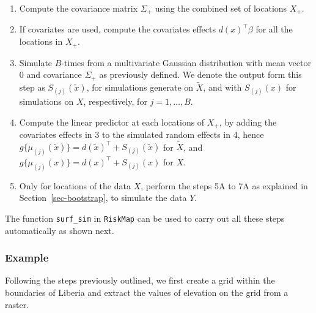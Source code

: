 \documentclass[
  letterpaper,
]{krantz}
\begin{document}
\begin{enumerate}
\def\labelenumi{\arabic{enumi}.}
\item
  Compute the covariance matrix \(\Sigma_{+}\) using the combined set of
  locations \(X_{+}\).
\item
  If covariates are used, compute the covariates effects
  \(d(x)^\top \beta\) for all the locations in \(X_{+}\).
\item
  Simulate \(B\)-times from a multivariate Gaussian distribution with
  mean vector 0 and covariance \(\Sigma_{+}\) as previously defined. We
  denote the output form this step as \(S_{(j)}(\tilde{x})\), for
  simulations generate on \(\tilde{X}\), and with \(S_{(j)}(x)\) for
  simulations on \(X\), respectively, for \(j=1,\ldots,B\).
\item
  Compute the linear predictor at each locations of \(X_{+}\), by adding
  the covariates effects in 3 to the simulated random effects in 4,
  hence
  \(g\{\mu_{(j)}(\tilde{x})\} = d(\tilde{x})^\top + S_{(j)}(\tilde{x})\)
  for \(\tilde{X}\), and \(g\{\mu_{(j)}(x)\} = d(x)^\top + S_{(j)}(x)\)
  for \(X\).
\item
  Only for locations of the data \(X\), perform the steps 5A to 7A as
  explained in Section~\ref{sec-bootstrap}, to simulate the data \(Y\).
\end{enumerate}

The function \texttt{surf\_sim} in \texttt{RiskMap} can be used to carry
out all these steps automatically as shown next.

\subsubsection{Example}\label{example-1}

Following the steps previously outlined, we first create a grid within
the boundaries of Liberia and extract the values of elevation on the
grid from a raster.
\end{document}
